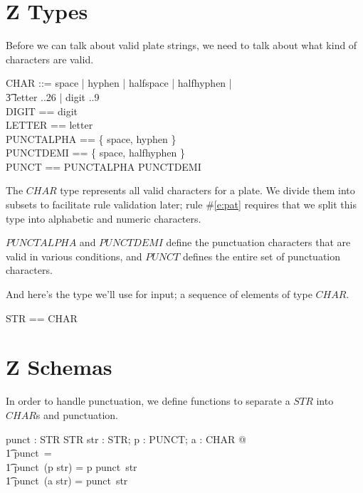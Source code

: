 \documentclass[11pt]{article}
\begin{document}
\section{Z Types}

Before we can talk about valid plate strings, we need to talk about what kind of characters are
valid.  

\begin{zed}
  CHAR  ::=  space | hyphen | halfspace | halfhyphen |      \\
  \t3 letter ..26 \rdata | digit ..9 \rdata \\
  DIGIT == \ran digit                                       \\
  LETTER == \ran letter                                     \\
  PUNCTALPHA == \{ space, hyphen \}                         \\
  PUNCTDEMI == \{ space, halfhyphen \}                      \\
  PUNCT == PUNCTALPHA \cup PUNCTDEMI
\end{zed}
The $CHAR$ type represents all valid characters for a plate.  We divide them into subsets to
facilitate rule validation later; rule \#\ref{e:pat} requires that we split this type into
alphabetic and numeric characters.

$PUNCTALPHA$ and $PUNCTDEMI$ define the punctuation characters that are valid in various
conditions, and $PUNCT$ defines the entire set of punctuation characters.


And here's the type we'll use for input; a sequence of elements of type $CHAR$.

\begin{zed}
  STR == \seq CHAR
\end{zed}


\section{Z Schemas}

In order to handle punctuation, we define functions to separate a $STR$ into $CHAR$s and
punctuation.

\begin{axdef}
  punct : STR \fun STR
  \where
  \forall str : STR; p : PUNCT; a : CHAR @ \\
  \t1 punct~\langle \rangle = \langle \rangle \land \\
  \t1 punct~(\langle p \rangle \cat str) = \langle p \rangle \cat punct~str \land \\
  \t1 punct~(\langle a \rangle \cat str) = punct~str
\end{axdef}
\end{document}
